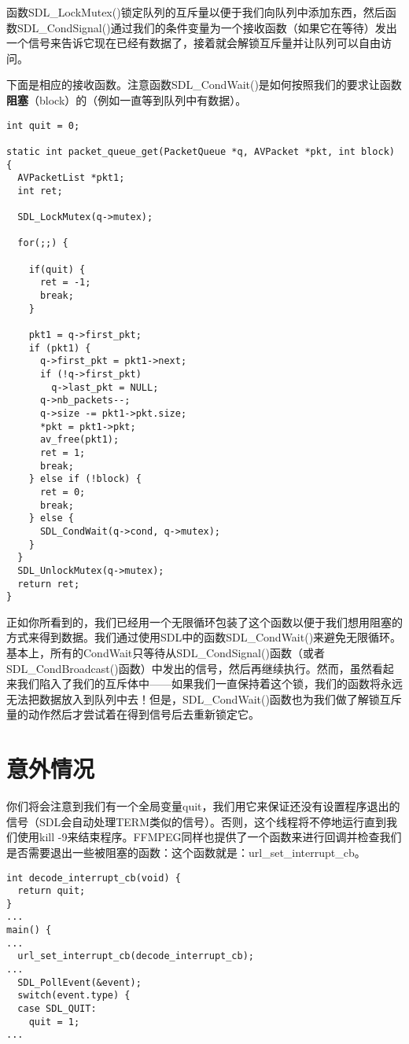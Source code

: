 函数SDL_LockMutex()锁定队列的互斥量以便于我们向队列中添加东西，然后函数SDL_CondSignal()通过我们的条件变量为一个接收函数（如果它在等待）发出一个信号来告诉它现在已经有数据了，接着就会解锁互斥量并让队列可以自由访问。

下面是相应的接收函数。注意函数SDL_CondWait()是如何按照我们的要求让函数\textbf{阻塞}（block）的（例如一直等到队列中有数据）。
\begin{lstlisting}
int quit = 0;

static int packet_queue_get(PacketQueue *q, AVPacket *pkt, int block) {
  AVPacketList *pkt1;
  int ret;

  SDL_LockMutex(q->mutex);

  for(;;) {

    if(quit) {
      ret = -1;
      break;
    }

    pkt1 = q->first_pkt;
    if (pkt1) {
      q->first_pkt = pkt1->next;
      if (!q->first_pkt)
        q->last_pkt = NULL;
      q->nb_packets--;
      q->size -= pkt1->pkt.size;
      *pkt = pkt1->pkt;
      av_free(pkt1);
      ret = 1;
      break;
    } else if (!block) {
      ret = 0;
      break;
    } else {
      SDL_CondWait(q->cond, q->mutex);
    }
  }
  SDL_UnlockMutex(q->mutex);
  return ret;
}
\end{lstlisting}

正如你所看到的，我们已经用一个无限循环包装了这个函数以便于我们想用阻塞的方式来得到数据。我们通过使用SDL中的函数SDL_CondWait()来避免无限循环。基本上，所有的CondWait只等待从SDL_CondSignal()函数（或者SDL_CondBroadcast()函数）中发出的信号，然后再继续执行。然而，虽然看起来我们陷入了我们的互斥体中——如果我们一直保持着这个锁，我们的函数将永远无法把数据放入到队列中去！但是，SDL_CondWait()函数也为我们做了解锁互斥量的动作然后才尝试着在得到信号后去重新锁定它。

\section{意外情况}

你们将会注意到我们有一个全局变量quit，我们用它来保证还没有设置程序退出的信号（SDL会自动处理TERM类似的信号）。否则，这个线程将不停地运行直到我们使用kill -9来结束程序。FFMPEG同样也提供了一个函数来进行回调并检查我们是否需要退出一些被阻塞的函数：这个函数就是：url_set_interrupt_cb。

\begin{lstlisting}
int decode_interrupt_cb(void) {
  return quit;
}
...
main() {
...
  url_set_interrupt_cb(decode_interrupt_cb);
...
  SDL_PollEvent(&event);
  switch(event.type) {
  case SDL_QUIT:
    quit = 1;
...
\end{lstlisting}

